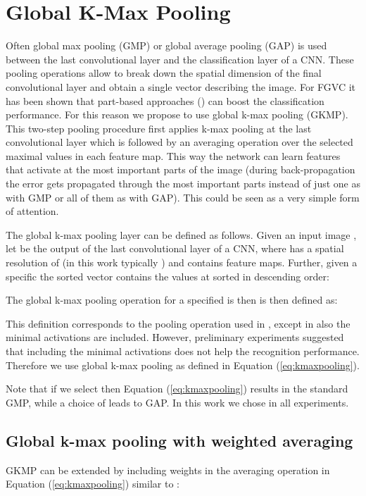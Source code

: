 \documentclass[10pt,twocolumn,letterpaper]{article}
\begin{document}
\section{Global K-Max Pooling}
\label{section:gkmp}
Often global max pooling (GMP) or global average pooling (GAP) is used between the last convolutional layer and the classification layer of a CNN. These pooling operations allow to break down the spatial dimension of the final convolutional layer and obtain a single vector describing the image. For FGVC it has been shown that part-based approaches (\eg \cite{zheng2017learning}) can boost the classification performance. For this reason we propose to use global k-max pooling (GKMP). This two-step pooling procedure first applies k-max pooling \cite{koniusz2013comparison} at the last convolutional layer which is followed by an averaging operation over the  selected maximal values in each feature map. This way the network can learn features that activate at the  most important parts of the image (during back-propagation the error gets propagated through the  most important parts instead of just one as with GMP or all of them as with GAP).
This could be seen as a very simple form of attention.

The global k-max pooling layer can be defined as follows. Given an input image , let  be the output of the last convolutional layer of a CNN, where  has a spatial resolution of  (in this work typically ) and contains  feature maps. Further, given a specific  the sorted vector  contains the values at  sorted in descending order:

The global k-max pooling operation for a specified  is then is then defined as:

This definition corresponds to the pooling operation used in \cite{durand2016weldon}, except in \cite{durand2016weldon} also the  minimal activations are included. However, preliminary experiments suggested that including the minimal activations does not help the recognition performance. Therefore we use global k-max pooling as defined in Equation (\ref{eq:kmaxpooling}).

Note that if we select  then Equation (\ref{eq:kmaxpooling}) results in the standard GMP, while a choice of  leads to GAP. In this work we chose  in all experiments.

\subsection{Global k-max pooling with weighted averaging}
\label{section:gkmp_wavg}
GKMP can be extended by including weights in the averaging operation in Equation (\ref{eq:kmaxpooling}) similar to \cite{weng2013learning}:
\end{document}
